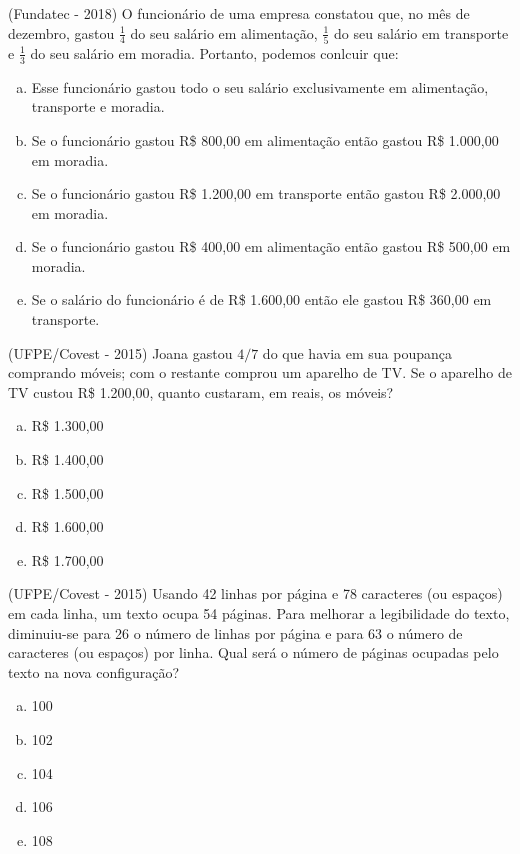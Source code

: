  \begin{exer}
 (Fundatec - 2018) O funcionário de uma empresa constatou que, no mês de dezembro, gastou $\frac{1}{4}$ do seu salário em alimentação, $\frac{1}{5}$ do seu salário em transporte e $\frac{1}{3}$ do seu salário em moradia. Portanto, podemos conlcuir que:
\begin{enumerate}[a)]
\item Esse funcionário gastou todo o seu salário exclusivamente em alimentação, transporte e moradia.
\item Se o funcionário gastou R\$ 800,00 em alimentação então gastou R\$ 1.000,00 em moradia.
\item Se o funcionário gastou R\$ 1.200,00 em transporte então gastou R\$ 2.000,00 em moradia.
\item Se o funcionário gastou R\$ 400,00 em alimentação então gastou R\$ 500,00 em moradia.
\item Se o salário do funcionário é de R\$ 1.600,00 então ele gastou R\$ 360,00 em transporte.
\end{enumerate}
 \end{exer}

 \begin{exer}
 (UFPE/Covest - 2015) Joana gastou $4/7$ do que havia em sua poupança comprando móveis; com o restante comprou um aparelho de TV. Se o aparelho de TV custou R\$ 1.200,00, quanto custaram, em reais, os móveis?
 \begin{enumerate}[a)]
 \item R\$ 1.300,00
 \item R\$ 1.400,00
 \item R\$ 1.500,00
 \item R\$ 1.600,00
 \item R\$ 1.700,00
 \end{enumerate}
 \end{exer}

 \begin{exer}
 (UFPE/Covest - 2015) Usando 42 linhas por página e 78 caracteres (ou espaços) em cada linha, um texto ocupa 54 páginas. Para melhorar a legibilidade do texto, diminuiu-se para 26 o número de linhas por página e para 63 o número de caracteres (ou espaços) por linha. Qual será o número de páginas ocupadas pelo texto na nova configuração?
 \begin{enumerate}[a)]
 \item 100
 \item 102
 \item 104
 \item 106
 \item 108
 \end{enumerate}
 \end{exer}



